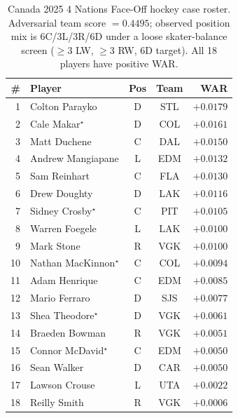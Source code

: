 \documentclass[12pt,letterpaper]{article}
\begin{document}
\begin{table}[h]
  \centering
  \caption{Canada 2025 4 Nations Face-Off hockey case roster.
    Adversarial team score $= 0.4495$; observed position mix is
    6C/3L/3R/6D under a loose skater-balance screen
    ($\geq 3$ LW, $\geq 3$ RW, 6D target). All 18 players have positive WAR.}
  \label{tab:canada2025}
  \small
  \begin{tabular}{r l c c r}
    \toprule
    \# & Player & Pos & Team & WAR \\
    \midrule
    1  & Colton Parayko              & D & STL & $+0.0179$ \\
    2  & Cale Makar$^{\star}$        & D & COL & $+0.0161$ \\
    3  & Matt Duchene                & C & DAL & $+0.0150$ \\
    4  & Andrew Mangiapane           & L & EDM & $+0.0132$ \\
    5  & Sam Reinhart                & C & FLA & $+0.0130$ \\
    6  & Drew Doughty                & D & LAK & $+0.0116$ \\
    7  & Sidney Crosby$^{\star}$     & C & PIT & $+0.0105$ \\
    8  & Warren Foegele              & L & LAK & $+0.0100$ \\
    9  & Mark Stone                  & R & VGK & $+0.0100$ \\
    10 & Nathan MacKinnon$^{\star}$  & C & COL & $+0.0094$ \\
    11 & Adam Henrique               & C & EDM & $+0.0085$ \\
    12 & Mario Ferraro               & D & SJS & $+0.0077$ \\
    13 & Shea Theodore$^{\star}$     & D & VGK & $+0.0061$ \\
    14 & Braeden Bowman              & R & VGK & $+0.0051$ \\
    15 & Connor McDavid$^{\star}$    & C & EDM & $+0.0050$ \\
    16 & Sean Walker                 & D & CAR & $+0.0050$ \\
    17 & Lawson Crouse               & L & UTA & $+0.0022$ \\
    18 & Reilly Smith                & R & VGK & $+0.0006$ \\
    \bottomrule
  \end{tabular}
  \par{}
\end{table}
\end{document}
